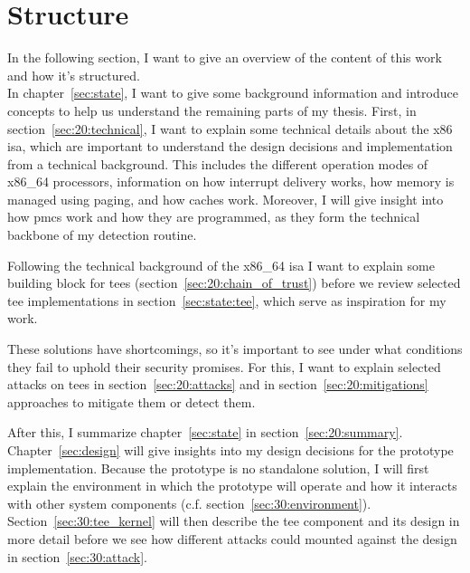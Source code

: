 \section{Structure}
\label{sec:10_structure}
In the following section, I want to give an overview of the content of this work and how
it's structured.\\

In chapter~\ref{sec:state}, I want to give some background information and
introduce concepts to help us understand the remaining parts of my
thesis. First, in section~\ref{sec:20:technical}, I want to explain some
technical details about the x86 \gls{isa}, which are important to understand the
design decisions and implementation from a technical background. This includes
the different operation modes of x86\_64 processors, information on how
interrupt delivery works, how memory is managed using paging, and how caches
work. Moreover, I will give insight into how \glspl{pmc} work and how they are
programmed, as they form the technical backbone of my detection routine.

Following the technical background of the x86\_64 \gls{isa} I want to explain
some building block for \glspl{tee} (section~\ref{sec:20:chain_of_trust}) before
we review selected \gls{tee} implementations in section~\ref{sec:state:tee},
which serve as inspiration for my work.

These solutions have shortcomings, so it's important to see under
what conditions they fail to uphold their security promises. For this, I want
to explain selected attacks on \glspl{tee} in section~\ref{sec:20:attacks} and
in section~\ref{sec:20:mitigations} approaches to mitigate them or detect them.

After this, I summarize chapter~\ref{sec:state} in
section~\ref{sec:20:summary}.\\

Chapter~\ref{sec:design} will give insights into my design decisions for
the prototype implementation. Because the prototype is no standalone solution, I
will first explain the environment in which the prototype will operate and how
it interacts with other system components (c.f.
section~\ref{sec:30:environment}). Section~\ref{sec:30:tee_kernel} will then
describe the \gls{tee} component and its design in more detail before we
see how different attacks could mounted against the design in
section~\ref{sec:30:attack}.\\

